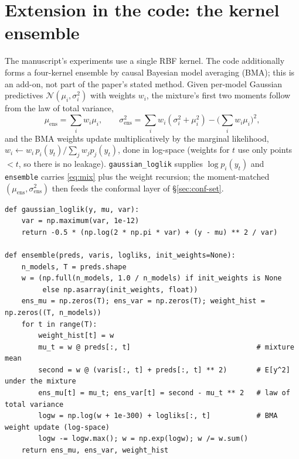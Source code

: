 \documentclass[11pt]{article}
\theoremstyle{plain}
\theoremstyle{definition}
\newcommand{\N}{\mathcal{N}}
\newcommand{\code}[1]{\texttt{#1}}
\begin{document}
\section{Extension in the code: the kernel ensemble}\label{sec:ensemble}
The manuscript's experiments use a single RBF kernel. The code additionally forms a four-kernel ensemble by causal Bayesian model averaging (BMA); this is an add-on, not part of the paper's stated method. Given per-model Gaussian predictives $\N(\mu_i,\sigma_i^2)$ with weights $w_i$, the mixture's first two moments follow from the law of total variance,
\begin{equation}
\mu_{\text{ens}}=\sum_i w_i\mu_i,\qquad
\sigma^2_{\text{ens}}=\sum_i w_i(\sigma_i^2+\mu_i^2)-\Big(\sum_i w_i\mu_i\Big)^2,
\label{eq:mix}
\end{equation}
and the BMA weights update multiplicatively by the marginal likelihood, $w_i\leftarrow w_i\,p_i(y_t)/\!\sum_j w_j p_j(y_t)$, done in log-space (weights for $t$ use only points $<t$, so there is no leakage). \code{gaussian\_loglik} supplies $\log p_i(y_t)$ and \code{ensemble} carries \eqref{eq:mix} plus the weight recursion; the moment-matched $(\mu_{\text{ens}},\sigma^2_{\text{ens}})$ then feeds the conformal layer of \S\ref{sec:conf-set}.
\begin{lstlisting}
def gaussian_loglik(y, mu, var):
    var = np.maximum(var, 1e-12)
    return -0.5 * (np.log(2 * np.pi * var) + (y - mu) ** 2 / var)

def ensemble(preds, varis, logliks, init_weights=None):
    n_models, T = preds.shape
    w = (np.full(n_models, 1.0 / n_models) if init_weights is None
         else np.asarray(init_weights, float))
    ens_mu = np.zeros(T); ens_var = np.zeros(T); weight_hist = np.zeros((T, n_models))
    for t in range(T):
        weight_hist[t] = w
        mu_t = w @ preds[:, t]                              # mixture mean
        second = w @ (varis[:, t] + preds[:, t] ** 2)       # E[y^2] under the mixture
        ens_mu[t] = mu_t; ens_var[t] = second - mu_t ** 2   # law of total variance
        logw = np.log(w + 1e-300) + logliks[:, t]           # BMA weight update (log-space)
        logw -= logw.max(); w = np.exp(logw); w /= w.sum()
    return ens_mu, ens_var, weight_hist
\end{lstlisting}

\end{document}
